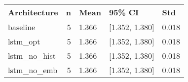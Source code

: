 \begin{tabular}{lrlll}
\toprule
Architecture & n & Mean & 95\% CI & Std \\
\midrule
baseline & 5 & 1.366 & [1.352, 1.380] & 0.018 \\
lstm\_opt & 5 & 1.366 & [1.352, 1.380] & 0.018 \\
lstm\_no\_hist & 5 & 1.366 & [1.352, 1.380] & 0.018 \\
lstm\_no\_emb & 5 & 1.366 & [1.352, 1.380] & 0.018 \\
\bottomrule
\end{tabular}
